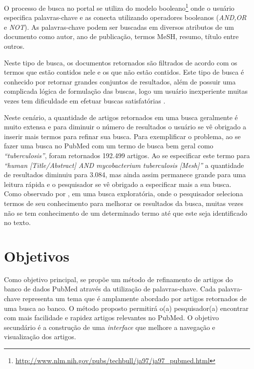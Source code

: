 O processo de busca no portal se utiliza do modelo booleano\footnote{\href{http://www.nlm.nih.gov/pubs/techbull/ja97/ja97\_pubmed.html}{http://www.nlm.nih.gov/pubs/techbull/ja97/ja97\_pubmed.html}} onde o usuário especifica palavras-chave e as conecta utilizando operadores booleanos (\emph{AND,OR} e \emph{NOT}). As palavras-chave podem ser buscadas em diversos atributos de um documento como autor, ano de publicação, termos MeSH, resumo, título entre outros. 

Neste tipo de busca, os documentos retornados são filtrados de acordo com os termos que estão contidos nele e os que não estão contidos. Este tipo de busca é conhecido por retornar grandes conjuntos de resultados, além de possuir uma complicada lógica de formulação das buscas, logo um usuário inexperiente muitas vezes tem dificuldade em efetuar buscas satisfatórias \cite{Jackson2007}. 

Neste cenário, a quantidade de artigos retornados em uma busca geralmente é muito extensa e para diminuir o número de resultados o usuário se vê obrigado a inserir mais termos para refinar sua busca. Para exemplificar o problema, ao se fazer uma busca no PubMed com um termo de busca bem geral como \emph{“tuberculosis”}, foram retornados 192.499 artigos. Ao se especificar este termo para \emph{“human [Title/Abstract] AND mycobacterium tuberculosis [Mesh]”} a quantidade de resultados diminuiu para 3.084, mas ainda assim permanece grande para uma leitura rápida e o pesquisador se vê obrigado a especificar mais a sua busca. Como observado por \cite{Perez-Iratxeta2001}, em uma busca exploratória, onde o pesquisador seleciona termos de seu conhecimento para melhorar os resultados da busca, muitas vezes não se tem conhecimento de um determinado termo até que este seja identificado no texto.

\section{Objetivos}
Como objetivo principal, se propõe um método de refinamento de artigos do banco de dados PubMed através da utilização de palavras-chave. Cada palavra-chave representa um tema que é amplamente abordado por artigos retornados de uma busca ao banco. O método proposto permitirá o(a) pesquisador(a) encontrar com mais facilidade e rapidez artigos relevantes no PubMed. O objetivo secundário é a construção de uma \emph{interface} que melhore a navegação e visualização dos artigos.

